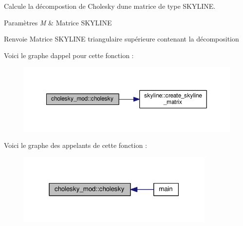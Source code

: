 Calcule la décompostion de Cholesky d\textquotesingle{}une matrice de type S\+K\+Y\+L\+I\+NE. 


\begin{DoxyParams}{Paramètres}
{\em M} & Matrice S\+K\+Y\+L\+I\+NE \\
\hline
\end{DoxyParams}
\begin{DoxyReturn}{Renvoie}
Matrice S\+K\+Y\+L\+I\+NE triangulaire supérieure contenant la décomposition 
\end{DoxyReturn}
Voici le graphe d\textquotesingle{}appel pour cette fonction \+:
\nopagebreak
\begin{figure}[H]
\begin{center}
\leavevmode
\includegraphics[width=350pt]{namespacecholesky__mod_a1cbaf08b2c159febf9d4a76d7819a1cd_cgraph}
\end{center}
\end{figure}
Voici le graphe des appelants de cette fonction \+:
\nopagebreak
\begin{figure}[H]
\begin{center}
\leavevmode
\includegraphics[width=279pt]{namespacecholesky__mod_a1cbaf08b2c159febf9d4a76d7819a1cd_icgraph}
\end{center}
\end{figure}
